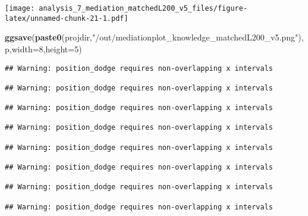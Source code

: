 \documentclass[
]{article}
\newenvironment{Shaded}{\begin{snugshade}}{\end{snugshade}}
\newcommand{\DataTypeTok}[1]{\textcolor[rgb]{0.13,0.29,0.53}{#1}}
\newcommand{\DecValTok}[1]{\textcolor[rgb]{0.00,0.00,0.81}{#1}}
\newcommand{\KeywordTok}[1]{\textcolor[rgb]{0.13,0.29,0.53}{\textbf{#1}}}
\newcommand{\NormalTok}[1]{#1}
\newcommand{\StringTok}[1]{\textcolor[rgb]{0.31,0.60,0.02}{#1}}
\begin{document}
\texttt{[image: analysis\_7\_mediation\_matchedL200\_v5\_files/figure-latex/unnamed-chunk-21-1.pdf]}

\begin{Shaded}
\begin{Highlighting}[]
\KeywordTok{ggsave}\NormalTok{(}\KeywordTok{paste0}\NormalTok{(projdir,}\StringTok{"/out/mediationplot_knowledge_matchedL200_v5.png"}\NormalTok{),p,}\DataTypeTok{width=}\DecValTok{8}\NormalTok{,}\DataTypeTok{height=}\DecValTok{5}\NormalTok{)}
\end{Highlighting}
\end{Shaded}

\begin{verbatim}
## Warning: position_dodge requires non-overlapping x intervals

## Warning: position_dodge requires non-overlapping x intervals

## Warning: position_dodge requires non-overlapping x intervals

## Warning: position_dodge requires non-overlapping x intervals

## Warning: position_dodge requires non-overlapping x intervals

## Warning: position_dodge requires non-overlapping x intervals

## Warning: position_dodge requires non-overlapping x intervals

## Warning: position_dodge requires non-overlapping x intervals
\end{verbatim}
\end{document}
